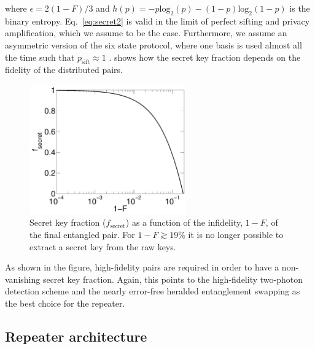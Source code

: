 where $\epsilon=2(1-F)/3$ and
$h(p)=-p\mathrm{log}_{2}(p)-(1-p)\mathrm{log}_{2}(1-p)$ is the binary entropy.
Eq.~\eqref{eq:secret2} is valid in the limit of perfect sifting and privacy
amplification, which we assume to be the case. Furthermore, we assume an
asymmetric version of the six state protocol, where one basis is used almost all
the time such that $p_{\mathrm{sift}}\approx1$ \cite{scarani}.
 shows how the secret key fraction depends on the fidelity
of the distributed pairs.
\begin{figure} 
\centering
\includegraphics[width=0.6\textwidth]{./figs_Borregaard_PRA2015/figure5}
\caption[Secret key fraction]{Secret key fraction ($f_{\mathrm{secret}}$) as a
function of the infidelity, $1-F$, of the final entangled pair. For
$1-F\gtrsim19 \%$ it is no longer possible to extract a secret key from the raw
keys.}
\label{fig:figure5}
\end{figure} 
As shown in the figure, high-fidelity pairs are required in order to have a
non-vanishing secret key fraction. Again, this points to the high-fidelity
two-photon detection scheme and the nearly error-free heralded entanglement
swapping as the best choice for the repeater.

\subsection{Repeater architecture}


